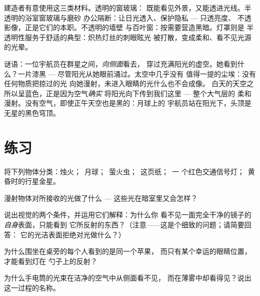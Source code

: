 \begin{example}[建筑中的三类材料]\label{ex:g7:light-sources-propagation:architecture}
建造者有意使用这三类材料。透明的窗玻璃：
既能看见外景，又能透进光线。半透明的浴室窗玻璃与磨砂
办公隔断：让日光透入、保护隐私 --- 只透亮度、
不透影像，正是它们的本职。不透明的墙壁
与百叶窗：按需要营造黑暗。灯罩则是
半透明性服务于舒适的典型：炽热灯丝的刺眼眩光
被打散，变成柔和、看不见光源的光晕。
\end{example}

\begin{remark}\label{rem:g7:light-sources-propagation:space}
谜语：一位宇航员在群星之间，\emph{向侧面}看去，
穿过充满阳光的虚空。她看到什么？一片漆黑 ---
尽管阳光从她眼前涌过。太空中几乎没有
值得一提的尘埃：没有任何物质把掠过的光
向她漫射，未进入眼睛的光什么也不会成像。
白天的天空之所以呈蓝色，正是因为空气\emph{确实}
将阳光向下传到我们这里 --- 整个大气层的
柔和漫射。没有空气，即使正午天空也是黑的：月球上的
宇航员站在阳光下，头顶是无星的黑色穹顶。
\end{remark}

\section{练习}

\begin{exercise}[$\star$]\label{exo:g7:light-sources-propagation:1}
将下列物体分类：烛火；\ 月球；\ 萤火虫；\ 这页纸；\ 一
个红色交通信号灯；\ 黄昏时的行星金星。
\end{exercise}

\begin{exercise}[$\star$]\label{exo:g7:light-sources-propagation:2}
漫射物体对所接收的光做了什么 ---
这些光在暗室里又会怎样？
\end{exercise}

\begin{exercise}[$\star$]\label{exo:g7:light-sources-propagation:3}
说出视觉的两个条件，并运用它们解释：为什么你
看不见一面完全干净的镜子的\emph{自身}表面，只能看到
它所反射的东西？（注意——这是个细致的问题；请简要回答：
它的光洁表面拒绝对光做什么？）
\end{exercise}

\begin{exercise}[$\star$]\label{exo:g7:light-sources-propagation:4}
为什么围坐在桌旁的每个人看到的是同一个苹果，
而只有某个幸运的眼睛位置，才能看到灯在
勺子上的反射？
\end{exercise}

\begin{exercise}[$\star$]\label{exo:g7:light-sources-propagation:5}
为什么手电筒的光束在洁净的空气中从侧面看不见，
而在薄雾中却看得见？说出这一过程的名称。
\end{exercise}

